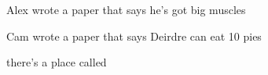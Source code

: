 \documentclass[gpscopy,onehalfspacing,11pt]{ubcdiss}
\begin{document}
	\citet{bringhurst-2002-teots}
	
	\citet{Crawford:2011ir}
	
	\citet{Lietzke:2011wd}
	
	Alex wrote a paper that says he's got big muscles \citealp{Christen:2011gu}
	
	Cam wrote a paper that says Deirdre can eat 10 pies \citealp{Velasco:2010tg}
	
	there's a place called \cite{kern2008governing}

	

	
	
	
	

\begin{singlespace}
\raggedright


\end{singlespace}

\appendix


\backmatter
\end{document}

